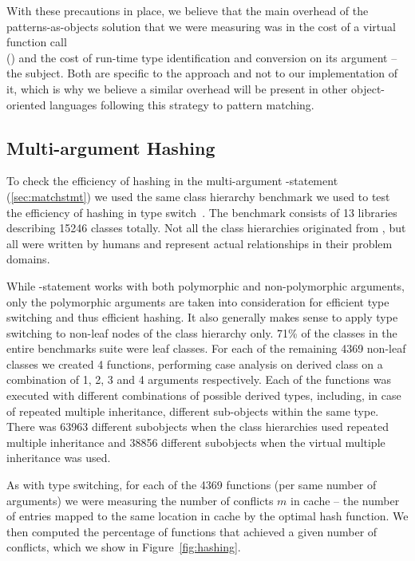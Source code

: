 \noindent
With these precautions in place, we believe that the main overhead of the 
patterns-as-objects solution that we were measuring was in the cost of a virtual 
function call \\ () and the cost of run-time type 
identification and conversion on its argument -- the subject. Both are specific 
to the approach and not to our implementation of it, which is why we believe a 
similar overhead will be present in other object-oriented languages following 
this strategy to pattern matching.

\subsection{Multi-argument Hashing}
\label{sec:morton}

To check the efficiency of hashing in the multi-argument -statement 
(\textsection\ref{sec:matchstmt}) we used the same class hierarchy benchmark we 
used to test the efficiency of hashing in type switch~\cite[]{TS12}.
The benchmark consists of 13 libraries describing 15246 classes totally. Not all 
the class hierarchies originated from \Cpp{}, but all were written by humans and 
represent actual relationships in their problem domains.

While -statement works with both polymorphic and non-polymorphic 
arguments, only the polymorphic arguments are taken into consideration for 
efficient type switching and thus efficient hashing. It also generally makes 
sense to apply type switching to non-leaf nodes of the class hierarchy only. 71\%
of the classes in the entire benchmarks suite were leaf classes. For each of the 
remaining 4369 non-leaf classes we created 4 functions, performing case analysis 
on derived class on a combination of 1, 2, 3 and 4 arguments respectively. Each 
of the functions was executed with different combinations of possible derived 
types, including, in case of repeated multiple inheritance, different 
sub-objects within the same type. There was 63963 different subobjects when the 
class hierarchies used repeated multiple inheritance and 38856 different 
subobjects when the virtual multiple inheritance was used.

As with type switching, for each of the 4369 functions (per same number of 
arguments) we were measuring the number of conflicts $m$ in cache -- the number 
of entries mapped to the same location in cache by the optimal hash function. 
We then computed the percentage of functions that achieved a given number of 
conflicts, which we show in Figure~\ref{fig:hashing}.

